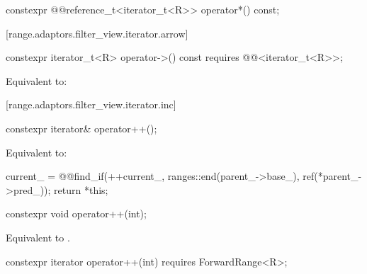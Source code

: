 {%
\begin{itemdecl}
constexpr @@reference_t<iterator_t<R>> operator*() const;
\end{itemdecl}

\begin{itemdescr}
\pnum
\oldtxt{\returns} 
\end{itemdescr}

{\color{newclr}
[range.adaptors.filter_view.iterator.arrow]{}

%
\begin{itemdecl}
constexpr iterator_t<R> operator->() const
  requires @@<iterator_t<R>>;
\end{itemdecl}

\begin{itemdescr}
\pnum
\effects
Equivalent to: 
\end{itemdescr}
} %

[range.adaptors.filter_view.iterator.inc]{}

%
\begin{itemdecl}
constexpr iterator& operator++();
\end{itemdecl}

\begin{itemdescr}
\pnum
\effects Equivalent to:
\begin{codeblock}
current_ = @@find_if(++current_, ranges::end(parent_->base_), ref(*parent_->pred_));
return *this;
\end{codeblock}
\end{itemdescr}

%
\begin{itemdecl}
constexpr void operator++(int);
\end{itemdecl}

\begin{itemdescr}
\pnum
\effects Equivalent to .
\end{itemdescr}

%
\begin{itemdecl}
constexpr iterator operator++(int) requires ForwardRange<R>;
\end{itemdecl}

}
